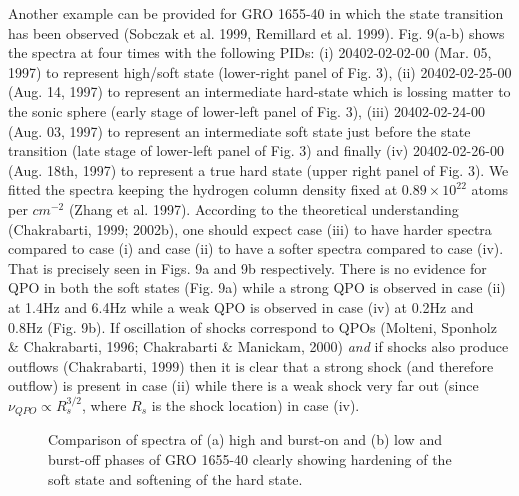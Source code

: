 \documentclass[referee]{cjaa}           %
\begin{document}
Another example can be provided for GRO 1655-40 
in which the state transition has been observed (Sobczak et al. 1999, Remillard et al. 1999). 
Fig. 9(a-b) shows the spectra at four times with the following PIDs:
(i) 20402-02-02-00 (Mar. 05, 1997) to represent high/soft state (lower-right panel of Fig. 3),
(ii) 20402-02-25-00 (Aug. 14, 1997) to represent an intermediate hard-state
which is lossing matter to the sonic sphere (early stage of lower-left panel of Fig. 3),
(iii) 20402-02-24-00 (Aug. 03, 1997) to represent an intermediate soft state just before 
the state transition (late stage of lower-left panel of Fig. 3)
and finally (iv) 20402-02-26-00 (Aug. 18th, 1997) to represent a true hard state (upper right panel of Fig. 3). 
We fitted the spectra keeping the hydrogen column density fixed at $0.89 \times 10^{22}$ atoms 
per $cm^{-2}$ (Zhang et al. 1997). 
According to the theoretical understanding (Chakrabarti, 1999; 2002b), one should expect case 
(iii) to have harder spectra compared to case (i) and case (ii) to have a softer 
spectra compared to case (iv). That is precisely seen in Figs. 9a and 9b respectively. 
There is no evidence for QPO in both the soft states (Fig. 9a) while a strong QPO is observed 
in case (ii) at 1.4Hz and 6.4Hz while a weak QPO is observed in case (iv) at 0.2Hz and 0.8Hz (Fig. 9b).
If oscillation of shocks correspond to QPOs (Molteni, Sponholz \& Chakrabarti, 1996;
Chakrabarti \& Manickam, 2000) {\it and} if shocks also produce outflows
(Chakrabarti, 1999) then it is clear that a strong shock (and therefore outflow)
is present in case (ii) while there is a weak shock very far out (since
$\nu_{QPO} \propto R_s^{3/2}$, where $R_s$ is the shock location) in case (iv).

\begin{figure}
\vskip -4.0cm
\hskip 1.5cm
\mbox{\textwidth{}\textwidth{}}
{   \begin{center}
\vskip -4.0cm
   \caption{Comparison of spectra of (a) high and burst-on and (b) low and burst-off phases of 
GRO 1655-40 clearly showing hardening of the soft state and softening of the hard state.}
   \end{center}}
\end{figure}
\end{document}
